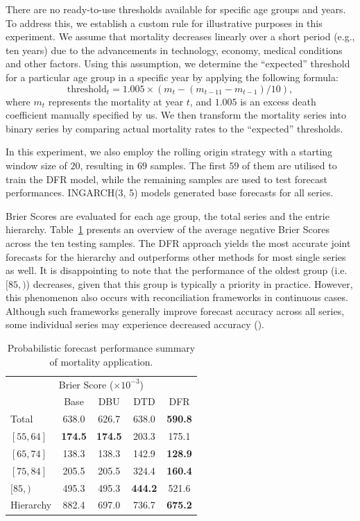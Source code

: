 \documentclass[a4paper,review,12pt,authoryear]{elsarticle}
\begin{document}
     There are no ready-to-use thresholds available for specific age groups and years. 
     To address this, we establish a custom rule for illustrative purposes in this experiment. 
     We assume that mortality decreases linearly over a short period (e.g., ten years) due to the advancements in technology, economy, medical conditions and other factors. 
     Using this assumption, we determine the ``expected'' threshold for a particular age group in a specific year by applying the following formula:
     \[
       \text{threshold}_t = 1.005 \times (m_t - (m_{t-11} - m_{t-1})/10),
     \]
     where $m_t$ represents the mortality at year $t$, and $1.005$ is an excess death coefficient manually specified by us.
     We then transform the mortality series into binary series by comparing actual mortality rates to the ``expected'' thresholds.
     
     In this experiment, we also employ the rolling origin strategy with a starting window size of $20$, resulting in $69$ samples.
     The first $59$ of them are utilised to train the DFR model, while the remaining samples are used to test forecast performances.
     INGARCH(3, 5) models generated base forecasts for all series. 
     
     Brier Scores are evaluated for each age group, the total series and the entrie hierarchy.
     Table~\ref{tab:mortality_age} presents an overview of the average negative Brier Scores across the ten testing samples.
     The DFR approach yields the most accurate joint forecasts for the hierarchy and outperforms other methods for most single series as well.
     It is disappointing to note that the performance of the oldest group (i.e. $[85, )$) decreases, given that this group is typically a priority in practice.
     However, this phenomenon also occurs with reconciliation frameworks in continuous cases. 
     Although such frameworks generally improve forecast accuracy across all series, some individual series may experience decreased accuracy (\citealp{zhangOptimalReconciliationImmutable2022a}).
     
     
     \begin{table}
       \centering
       \caption{\label{tab:mortality_age} Probabilistic forecast performance summary of mortality application.}
       \begin{tabular}{lcccc}
       \toprule
       \multicolumn{5}{c}{Brier Score ($\times 10^{-3}$)}\\ 
       & Base & DBU & DTD & DFR \\\midrule
       Total & 638.0 & 626.7 & 638.0 & \textbf{590.8} \\
       $[55, 64]$ & \textbf{174.5} & \textbf{174.5} & 203.3 & 175.1 \\
       $[65, 74]$ & 138.3 & 138.3 & 142.9 & \textbf{128.9}\\
       $[75, 84]$ & 205.5 & 205.5 & 324.4 & \textbf{160.4}\\
       $[85, )$ & 495.3 & 495.3 & \textbf{444.2} & 521.6\\
       Hierarchy & 882.4 & 697.0 & 736.7 & \textbf{675.2} \\
       \bottomrule
      \end{tabular}
     \end{table}
\end{document}
